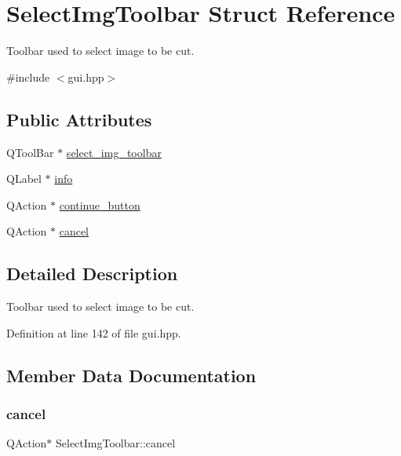 \hypertarget{structSelectImgToolbar}{}\section{Select\+Img\+Toolbar Struct Reference}
\label{structSelectImgToolbar}


Toolbar used to select image to be cut.  




{\ttfamily \#include $<$gui.\+hpp$>$}

\subsection*{Public Attributes}
\begin{DoxyCompactItemize}
\item 
Q\+Tool\+Bar $\ast$ \mbox{\hyperlink{structSelectImgToolbar_a779bc326cf08c9fbcd1ffebb43a664eb}{select\+\_\+img\+\_\+toolbar}}
\item 
Q\+Label $\ast$ \mbox{\hyperlink{structSelectImgToolbar_a3cf6ac92fbe60877873c89939217e1de}{info}}
\item 
Q\+Action $\ast$ \mbox{\hyperlink{structSelectImgToolbar_a82569764f9d7e13b406a668e9e50290a}{continue\+\_\+button}}
\item 
Q\+Action $\ast$ \mbox{\hyperlink{structSelectImgToolbar_a0b17a222dff0441c0f10509315ce9052}{cancel}}
\end{DoxyCompactItemize}


\subsection{Detailed Description}
Toolbar used to select image to be cut. 

Definition at line 142 of file gui.\+hpp.



\subsection{Member Data Documentation}
\mbox{\label{structSelectImgToolbar_a0b17a222dff0441c0f10509315ce9052}} 
\subsubsection{\texorpdfstring{cancel}{cancel}}
{\footnotesize\ttfamily Q\+Action$\ast$ Select\+Img\+Toolbar\+::cancel}

